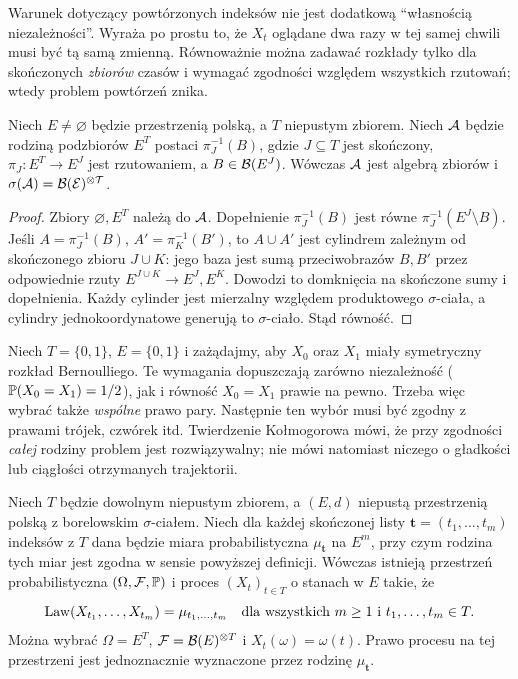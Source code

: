 Warunek dotyczący powtórzonych indeksów nie jest dodatkową
``własnością niezależności''. Wyraża po prostu to, że
$X_t$ oglądane dwa razy w tej samej chwili musi być tą samą
zmienną. Równoważnie można zadawać rozkłady tylko dla
skończonych \emph{zbiorów} czasów i wymagać zgodności
względem wszystkich rzutowań; wtedy problem powtórzeń znika.

\begin{lemat}
Niech $E\ne\varnothing$ będzie przestrzenią polską, a $T$
niepustym zbiorem. Niech $\cal A$ będzie rodziną podzbiorów
$E^T$ postaci $\pi_J^{-1}(B)$, gdzie
$J\subseteq T$ jest skończony, $\pi_J:E^T\to E^J$
jest rzutowaniem, a $B\in\mathcal{B}(E^J)$.
Wówczas $\cal A$ jest algebrą zbiorów i
$\sigma(\cal A)=\mathcal{B}(E)^{\otimes T}$.
\end{lemat}
\begin{proof}
Zbiory $\varnothing,E^T$ należą do $\cal A$.
Dopełnienie $\pi_J^{-1}(B)$ jest równe
$\pi_J^{-1}(E^J\setminus B)$. Jeśli
$A=\pi_J^{-1}(B)$, $A'=\pi_K^{-1}(B')$, to
$A\cup A'$ jest cylindrem zależnym od skończonego zbioru
$J\cup K$: jego baza jest sumą przeciwobrazów $B,B'$ przez
odpowiednie rzuty $E^{J\cup K}\to E^J,E^K$.
Dowodzi to domknięcia na skończone sumy i dopełnienia.
Każdy cylinder jest mierzalny względem produktowego
$\sigma$-ciała, a cylindry jednokoordynatowe generują
to $\sigma$-ciało. Stąd równość.
\end{proof}


\begin{przyklad}
Niech $T=\{0,1\}$, $E=\{0,1\}$ i zażądajmy, aby
$X_0$ oraz $X_1$ miały symetryczny rozkład Bernoulliego.
Te wymagania dopuszczają zarówno niezależność
($\mathbb{P}(X_0=X_1)=1/2$), jak i równość $X_0=X_1$ prawie
na pewno. Trzeba więc wybrać także \emph{wspólne} prawo pary.
Następnie ten wybór musi być zgodny z prawami trójek,
czwórek itd. Twierdzenie Kołmogorowa mówi, że przy
zgodności \emph{całej} rodziny problem jest rozwiązywalny;
nie mówi natomiast niczego o gładkości lub ciągłości
otrzymanych trajektorii.
\end{przyklad}

\begin{twierdzenie}
\label{thm:kol-ext}
Niech $T$ będzie dowolnym niepustym zbiorem, a $(E,d)$
niepustą przestrzenią polską z borelowskim $\sigma$-ciałem.
Niech dla każdej skończonej listy $\mathbf t=(t_1,\ldots,t_m)$
indeksów z $T$ dana będzie miara probabilistyczna
$\mu_{\mathbf t}$ na $E^m$, przy czym rodzina tych miar
jest zgodna w sensie powyższej definicji.
Wówczas istnieją przestrzeń probabilistyczna
$(\Omega,\mathcal{F},\mathbb{P})$ i proces
$(X_t)_{t\in T}$ o stanach w $E$ takie, że
\[
\operatorname{Law}(X_{t_1},\ldots,X_{t_m})=\mu_{t_1,\ldots,t_m}
\quad\text{dla wszystkich }m\ge1\text{ i }t_1,\ldots,t_m\in T.
\]
Można wybrać $\Omega=E^T$,
$\mathcal{F}=\mathcal{B}(E)^{\otimes T}$ i $X_t(\omega)=\omega(t)$.
Prawo procesu na tej przestrzeni jest jednoznacznie wyznaczone
przez rodzinę $\mu_{\mathbf t}$.
\end{twierdzenie}


